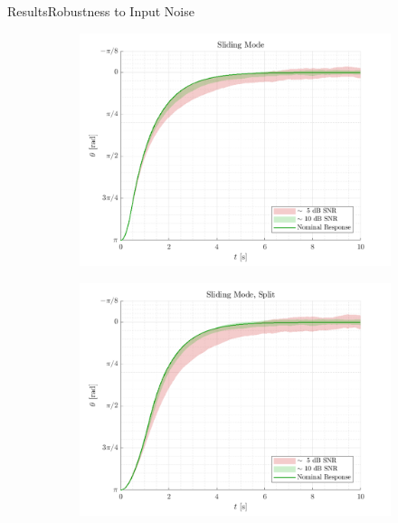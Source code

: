 \begin{frame}{Results}{Robustness to Input Noise}
\begin{figure}[H]
\begin{minipage}{0.45\linewidth}
  \begin{figure}[H]
    \centering
    \includegraphics[width=\linewidth]{figures/slidingModeInputNoise}
  \end{figure}        
\end{minipage}\hfill      
\begin{minipage}{0.45\linewidth}
  \begin{figure}[H]
    \centering
    \includegraphics[width=1\linewidth]{figures/slidingModeSplitInputNoise}
  \end{figure}                
\end{minipage}\hfill \\
\end{figure}
\end{frame}

